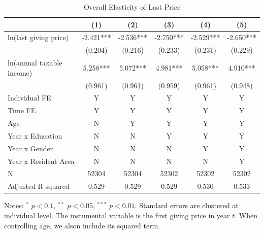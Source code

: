 \documentclass[
  11pt,
  a4paper,
]{article}
\begin{document}
\begin{table}

\caption{\label{tab:LastOverall}Overall Elasticity of Last Price}
\centering
\fontsize{9}{11}\selectfont
\begin{threeparttable}
\begin{tabular}[t]{lccccc}
\toprule
 & (1) & (2) & (3) & (4) & (5)\\
\midrule
ln(last giving price) & -2.421*** & -2.536*** & -2.750*** & -2.529*** & -2.650***\\
 & (0.204) & (0.216) & (0.233) & (0.231) & (0.229)\\
ln(annual taxable income) & 5.258*** & 5.072*** & 4.981*** & 5.058*** & 4.910***\\
 & (0.961) & (0.961) & (0.959) & (0.961) & (0.948)\\
Individual FE & Y & Y & Y & Y & Y\\
Time FE & Y & Y & Y & Y & Y\\
Age & N & Y & Y & Y & Y\\
Year x Education & N & N & Y & Y & Y\\
Year x Gender & N & N & N & Y & Y\\
Year x Resident Area & N & N & N & N & Y\\
N & 52304 & 52304 & 52302 & 52302 & 52302\\
Adjusted R-squared & 0.529 & 0.529 & 0.529 & 0.530 & 0.533\\
\bottomrule
\end{tabular}
\begin{tablenotes}
\item Notes: $^{*}$ $p < 0.1$, $^{**}$ $p < 0.05$, $^{***}$ $p < 0.01$. Standard errors are clustered at individual level. The instumental variable is the first giving price in year $t$. When controlling age, we alson include its squared term.
\end{tablenotes}
\end{threeparttable}
\end{table}
\end{document}
